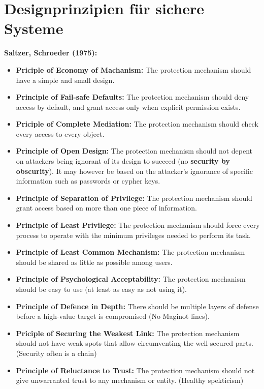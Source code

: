 \documentclass[openany]{book}
\begin{document}
\section{Designprinzipien für sichere Systeme }

\textbf{Saltzer, Schroeder (1975):}
\begin{itemize}
\item \textbf{Priciple of Economy of Machanism:} The protection mechanism should have a simple and small design.
\item \textbf{Principle of Fail-safe Defaults:} The protection mechanism should deny access by default, and grant access only when explicit permission exists.
\item \textbf{Priciple of Complete Mediation:} The protection mechanism should check every access to every object.
\item \textbf{Principle of Open Design:} The protection mechanism should not depent on attackers being ignorant of its design to succeed (no \textbf{security by obscurity}). It may however be based on the attacker's ignorance of specific information such as passwords or cypher keys.
\item \textbf{Principle of Separation of Privilege:} The protection mechanism should grant access based on more than one piece of information.
\item \textbf{Principle of Least Privilege:} The protection mechanism should force every process to operate with the minimum privileges needed to perform its task.
\item \textbf{Principle of Least Common Mechanism:} The protection mechanism should be shared as little as possible among users.
\item \textbf{Principle of Psychological Acceptability:} The protection mechanism should be easy to use (at least as easy as not using it).
\item \textbf{Principle of Defence in Depth:} There should be multiple layers of defense before a high-value target is compromised (No Maginot lines).
\item \textbf{Priciple of Securing the Weakest Link:} The protection mechanism should not have weak spots that allow circumventing the well-secured parts. (Security often is a chain)
\item \textbf{Principle of Reluctance to Trust:} The protection mechanism should not give unwarranted trust to any mechanism or entity. (Healthy spekticism)
\end{itemize}
\end{document}
